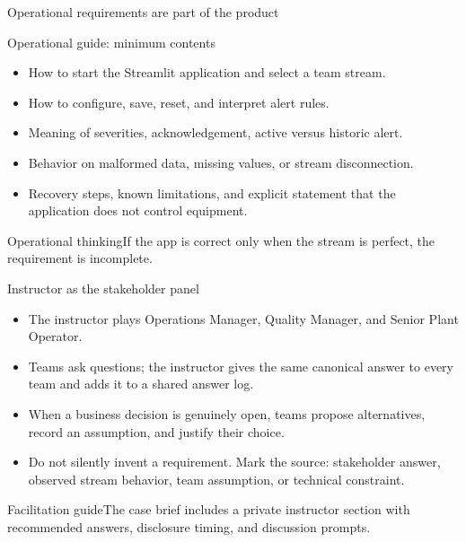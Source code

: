 \begin{frame}{Operational requirements are part of the product}
\begin{block}{Operational guide: minimum contents}\begin{itemize}
\item How to start the Streamlit application and select a team stream.
\item How to configure, save, reset, and interpret alert rules.
\item Meaning of severities, acknowledgement, active versus historic alert.
\item Behavior on malformed data, missing values, or stream disconnection.
\item Recovery steps, known limitations, and explicit statement that the application does not control equipment.
\end{itemize}\end{block}
\begin{alertblock}{Operational thinking}If the app is correct only when the stream is perfect, the requirement is incomplete.\end{alertblock}
\coursefooter
\end{frame}

\begin{frame}{Instructor as the stakeholder panel}
\begin{itemize}
\item The instructor plays Operations Manager, Quality Manager, and Senior Plant Operator.
\item Teams ask questions; the instructor gives the same canonical answer to every team and adds it to a shared answer log.
\item When a business decision is genuinely open, teams propose alternatives, record an assumption, and justify their choice.
\item Do not silently invent a requirement. Mark the source: stakeholder answer, observed stream behavior, team assumption, or technical constraint.
\end{itemize}
\begin{block}{Facilitation guide}The case brief includes a private instructor section with recommended answers, disclosure timing, and discussion prompts.\end{block}
\coursefooter
\end{frame}

